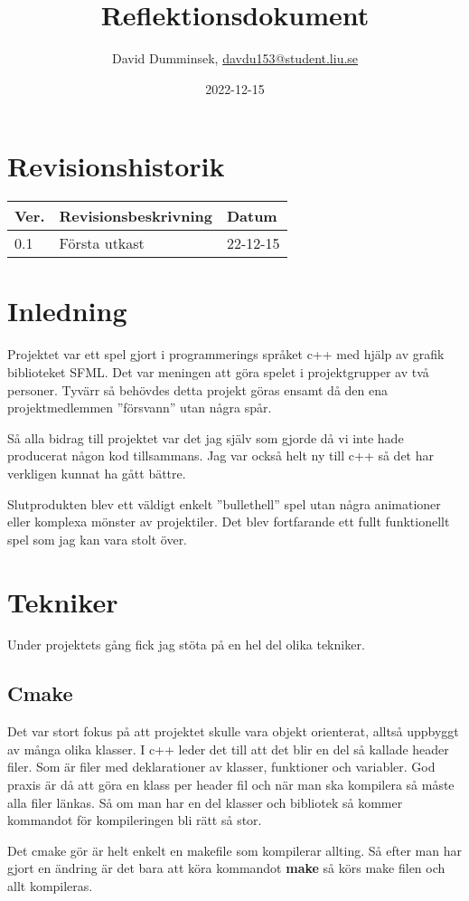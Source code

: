 \documentclass{TDP003mall}
\author{David Dumminsek, \url{davdu153@student.liu.se}\\}
\title{Reflektionsdokument}
\date{2022-12-15}
\begin{document}
\projectpage
\section{Revisionshistorik}
\begin{table}[!h]
\begin{tabularx}{\linewidth}{|l|X|l|}
\hline
Ver. & Revisionsbeskrivning & Datum \\\hline
0.1 & Första utkast & 22-12-15\\\hline
\end{tabularx}
\end{table}


\section{Inledning}
Projektet var ett spel gjort i programmerings språket c++ med hjälp av grafik biblioteket
SFML. Det var meningen att göra spelet i projektgrupper av två personer. Tyvärr så behövdes detta
projekt göras ensamt då den ena projektmedlemmen ''försvann'' utan några spår. 

Så alla bidrag till projektet var det jag själv som gjorde då vi inte hade producerat någon kod 
tillsammans. Jag var också helt ny till c++ så det har verkligen kunnat ha gått bättre.

Slutprodukten blev ett väldigt enkelt ''bullethell'' spel utan några animationer eller komplexa 
mönster av projektiler. 
Det blev fortfarande ett fullt funktionellt spel som jag kan vara stolt över.

\section{Tekniker}
Under projektets gång fick jag stöta på en hel del olika tekniker.
\subsection{Cmake}
Det var stort fokus på att projektet skulle vara objekt orienterat, alltså uppbyggt av
många olika klasser. I c++ leder det till att det blir en del så kallade header filer. Som 
är filer med deklarationer av klasser, funktioner och variabler. God praxis är då att göra en
klass per header fil och när man ska kompilera så måste alla filer länkas. 
Så om man har en del klasser och bibliotek så kommer kommandot för kompileringen bli rätt så stor.

Det cmake gör är helt enkelt en makefile som kompilerar allting. 
Så efter man har gjort en ändring är det bara att köra kommandot \textbf{make} så körs make filen och allt kompileras.
\end{document}
